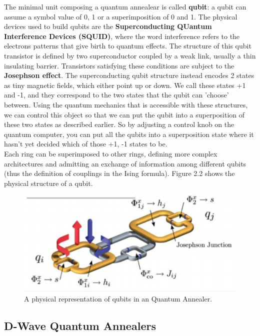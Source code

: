  The minimal unit composing a quantum annealear is called \textbf{qubit}: a qubit can assume a symbol value of 0, 1 or a superimposition of 0 and 1. The physical devices used to build qubits are the \textbf{Superconducting QUantum Interference Devices (SQUID)}, where the word interference refers to the electrons patterns that give birth to quantum effects. The structure of this qubit transistor is defined by two superconductor coupled by a weak link, usually a thin insulating barrier. Transistors satisfying these conditions are subject to the \textbf{Josephson effect}. The superconducting qubit structure instead encodes 2 states as tiny magnetic fields, which either point up or down. We call these states +1 and -1, and they correspond to the two states that the qubit can 'choose' between. Using the quantum mechanics that is accessible with these structures, we can control this object so that we can put the qubit into a superposition of these two states as described earlier. So by adjusting a control knob on the quantum computer, you can put all the qubits into a superposition state where it hasn't yet decided which of those +1, -1 states to be.\\
  Each ring can be superimposed to other rings, defining more complex architectures and admitting an exchange of information among different qubits (thus the definition of couplings in the Ising formula). Figure 2.2 shows the physical structure of a qubit.\\
  
  \begin{figure}[t]
	\begin{center}
	\includegraphics{images/QA.PNG}
	\caption{A physical representation of qubits in an Quantum Annealer.}
	\end{center}
\end{figure}

\subsection{D-Wave Quantum Annealers}

